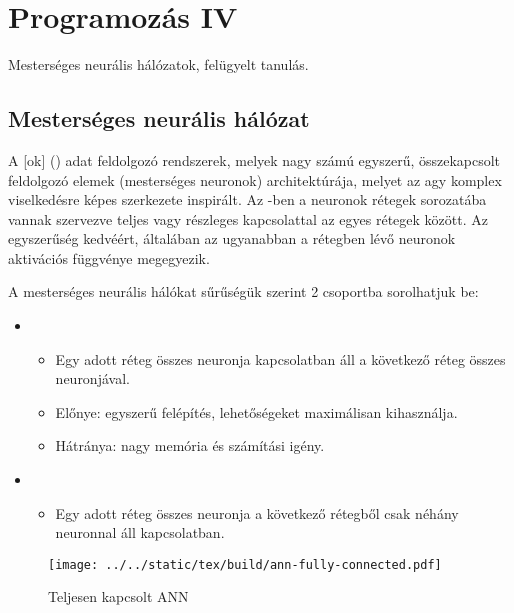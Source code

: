 \documentclass[../../main.tex]{subfiles}
\begin{document}
\section{Programozás IV}

\begin{fulltheorem}
  Mesterséges neurális hálózatok, felügyelt tanulás.
\end{fulltheorem}

\subsection{Mesterséges neurális hálózat}

A [ok] () adat feldolgozó rendszerek,
melyek nagy számú egyszerű, összekapcsolt feldolgozó elemek (mesterséges
neuronok) architektúrája, melyet az agy komplex viselkedésre képes szerkezete
inspirált.
Az -ben a neuronok rétegek sorozatába vannak szervezve teljes vagy
részleges kapcsolattal az egyes rétegek között.
Az egyszerűség kedvéért, általában az ugyanabban a rétegben lévő neuronok
aktivációs függvénye megegyezik.

A mesterséges neurális hálókat sűrűségük szerint 2 csoportba sorolhatjuk be:
\begin{itemize}
  \item {}
        \begin{itemize}
          \item Egy adott réteg összes neuronja kapcsolatban áll a következő
                réteg összes neuronjával.
          \item Előnye: egyszerű felépítés,
                lehetőségeket maximálisan kihasználja.
          \item Hátránya: nagy memória és számítási igény.
        \end{itemize}
  \item {}
        \begin{itemize}
          \item Egy adott réteg összes neuronja a következő rétegből csak
                néhány neuronnal áll kapcsolatban.
        \end{itemize}
\end{itemize}

\begin{figure}[H]
  \centering
  \texttt{[image: ../../static/tex/build/ann-fully-connected.pdf]}
  \caption{Teljesen kapcsolt ANN}
  \label{fig:ann-fc}
\end{figure}
\end{document}

